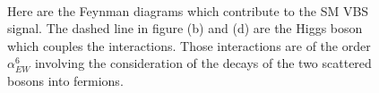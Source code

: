 \begin{figure}[tbp]
	\begin{center}
		\\
		\caption{
			Here are the Feynman diagrams which contribute to the SM VBS signal. The dashed line in figure (b) and (d) are the Higgs boson which couples the interactions. Those interactions are of the order $\alpha_{EW}^6$ involving the consideration of the decays of the two scattered bosons into fermions. 
		}
		\label{Fig:feynmanVBS}
	\end{center}
\end{figure} 


